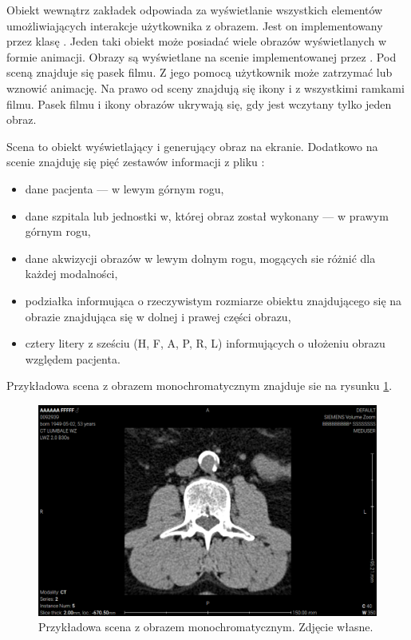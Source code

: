 \par
Obiekt wewnątrz zakładek odpowiada za wyświetlanie wszystkich elementów umożliwiających interakcje użytkownika z obrazem.
Jest on implementowany przez klasę .
Jeden taki obiekt może posiadać wiele obrazów wyświetlanych w formie animacji.
Obrazy są wyświetlane na scenie implementowanej przez .
Pod sceną znajduje się pasek filmu.
Z jego pomocą użytkownik może zatrzymać lub wznowić animację.
Na prawo od sceny znajdują się ikony i z wszystkimi ramkami filmu.
Pasek filmu i ikony obrazów ukrywają się, gdy jest wczytany tylko jeden obraz.
\par
Scena to obiekt wyświetlający i generujący obraz na ekranie.
Dodatkowo na scenie znajduję się pięć zestawów informacji z pliku \DICOM:
\begin{itemize}
    \item dane pacjenta --- w lewym górnym rogu,
    \item dane szpitala lub jednostki w, której obraz został wykonany --- w prawym górnym rogu,
    \item dane akwizycji obrazów w lewym dolnym rogu, mogących sie różnić dla każdej modalności,
    \item podziałka informująca o rzeczywistym rozmiarze obiektu znajdującego się na obrazie znajdująca się w dolnej i prawej części obrazu,
    \item cztery litery z sześciu (H, F, A, P, R, L) informujących o ułożeniu obrazu względem pacjenta.
\end{itemize}
Przykładowa scena z obrazem monochromatycznym znajduje sie na rysunku \ref{fig:sokar-gui-scene}.

\begin{figure}[!htbp]
    \centering
    \includegraphics[width=\textwidth]{img/sokar-gui-003.png}
    \caption{Przykładowa scena z obrazem monochromatycznym. Zdjęcie własne.}
    \label{fig:sokar-gui-scene}
\end{figure}

